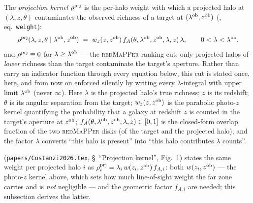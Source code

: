 \documentclass[a4paper, 11pt]{article}
\newcommand{\lob}{\lambda^{\rm ob}}
\newcommand{\zob}{z^{\rm ob}}
\newcommand{\rhoprj}{\rho^{\rm prj}}
\begin{document}
The \emph{projection kernel} \(\rhoprj\) is the per-halo weight
with which a projected halo at \((\lambda,z,\theta)\) contaminates
the observed richness of a target at \((\lob,\zob)\)
(\citealt{Costanzi2026}, eq.~\texttt{weight}):
\begin{equation}
\rhoprj(\lambda,z,\theta\mid\lob,\zob)
\;=\; w_z(z,\zob)\,f_A(\theta,\lob,\zob,\lambda,z)\,\lambda,
\qquad 0<\lambda<\lob,
\label{eq:rho_prj}
\end{equation}
and \(\rhoprj\equiv0\) for \(\lambda\ge\lob\)
--- the \textsc{redMaPPer} ranking cut: only projected halos of
\emph{lower} richness than the target contaminate the target's
aperture. Rather than carry an indicator function through every
equation below, this cut is stated once, here, and from now on
enforced silently by writing every \(\lambda\)-integral with
upper limit \(\lob\) (never \(\infty\)). Here \(\lambda\) is the
projected halo's true richness; \(z\) is its redshift; \(\theta\)
is its angular separation from the target; \(w_z(z,\zob)\) is the
parabolic photo-\(z\) kernel quantifying the probability that a
galaxy at redshift \(z\) is counted in the target's aperture at
\(\zob\); \(f_A(\theta,\lob,\zob,\lambda,z)\in[0,1]\) is the
closed-form overlap fraction of the two \textsc{redMaPPer} disks
(of the target and the projected halo); and the factor \(\lambda\)
converts ``this halo is present'' into ``this halo contributes
\(\lambda\) counts''.

\citealt{Costanzi2026} (\texttt{papers/Costanzi2026.tex},
\S~``Projection kernel'', Fig.~1) states the same weight per
projected halo \(i\) as
\(\rhoprj_i = \lambda_i\,w(z_i,\zob)\,f_{A,i}\): both
\(w(z_i,\zob)\) --- the photo-\(z\) kernel above, which sets how
much line-of-sight weight the far zone carries and is \emph{not}
negligible --- and the geometric factor \(f_{A,i}\) are needed;
this subsection derives the latter.
\end{document}
